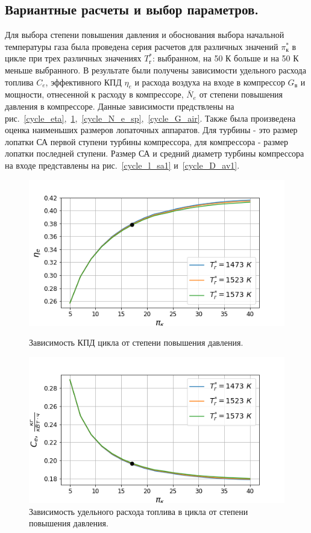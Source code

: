 \documentclass[a4paper,12pt]{article}
\begin{document}
    \subsection{Вариантные расчеты и выбор параметров.}
    Для выбора степени повышения давления и обоснования выбора начальной температуры газа была проведена серия расчетов
    для различных значений $\pi_к^*$ в цикле при трех различных значениях $T_г^*$: выбранном, на 50 К больше и на 50 К
    меньше выбранного.
    В результате были получены зависимости удельного расхода топлива $C_e$, эффективного КПД $\eta_e$ и расхода
    воздуха на входе в компрессор $G_в$ и мощности, отнесенной к расходу в компрессоре, $\bar{N}_e$
    от степени повышения давления в компрессоре.
    Данные зависимости предствлены на рис.~\ref{cycle_eta},~\ref{cycle_C_e},~\ref{cycle_N_e_sp},~\ref{cycle_G_air}.
    Также была произведена оценка наименьших размеров лопаточных аппаратов.
    Для турбины - это размер лопатки СА первой ступени турбины компрессора, для компрессора - размер лопатки
    последней ступени.
    Размер СА и средний диаметр турбины компрессора на входе представлены на рис.~\ref{cycle_l_sa1} и~\ref{cycle_D_av1}.

    \begin{figure}[h!]
        \centering
        \includegraphics[scale=0.8]{../plots/cycle_eta_e.png}
        \caption{Зависимость КПД цикла от степени повышения давления.}
        \label{cycle_eta}

        \includegraphics[scale=0.8]{../plots/cycle_C_e.png}
        \caption{Зависимость удельного расхода топлива в цикла от степени повышения давления.}
        \label{cycle_C_e}
    \end{figure}
\end{document}
